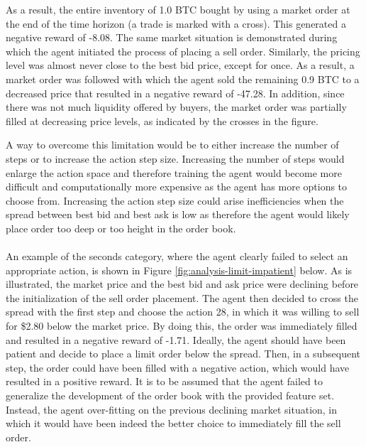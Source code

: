 As a result, the entire inventory of 1.0 BTC bought by using a market order at the end of the time horizon (a trade is marked with a cross).
This generated a negative reward of -8.08.
The same market situation is demonstrated during which the agent initiated the process of placing a sell order.
Similarly, the pricing level was almost never close to the best bid price, except for once.
As a result, a market order was followed with which the agent sold the remaining 0.9 BTC to a decreased price that resulted in a negative reward of -47.28.
In addition, since there was not much liquidity offered by buyers, the market order was partially filled at decreasing price levels, as indicated by the crosses in the figure.

A way to overcome this limitation would be to either increase the number of steps or to increase the action step size.
Increasing the number of steps would enlarge the action space and therefore training the agent would become more difficult and computationally more expensive as the agent has more options to choose from.
Increasing the action step size could arise inefficiencies when the spread between best bid and best ask is low as therefore the agent would likely place order too deep or too height in the order book.
\\
\\
An example of the seconds category, where the agent clearly failed to select an appropriate action, is shown in Figure \ref{fig:analysis-limit-impatient} below.
As is illustrated, the market price and the best bid and ask price were declining before the initialization of the sell order placement. 
The agent then decided to cross the spread with the first step and choose the action 28, in which it was willing to sell for \$2.80 below the market price.
By doing this, the order was immediately filled and resulted in a negative reward of -1.71.
Ideally, the agent should have been patient and decide to place a limit order below the spread.
Then, in a subsequent step, the order could have been filled with a negative action, which would have resulted in a positive reward.
It is to be assumed that the agent failed to generalize the development of the order book with the provided feature set.
Instead, the agent over-fitting on the previous declining market situation, in which it would have been indeed the better choice to immediately fill the sell order.

